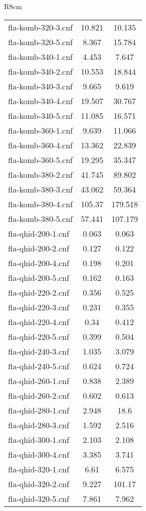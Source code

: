 \begin{wraptable}[30]{R}{8cm}
\begin{tabular}{l| c c }
fla-komb-320-3.cnf & 10.821 & 10.135 \\
fla-komb-320-5.cnf & 8.367 & 15.784 \\
fla-komb-340-1.cnf & 4.453 & 7.647 \\
fla-komb-340-2.cnf & 10.553 & 18.844 \\
fla-komb-340-3.cnf & 9.665 & 9.619 \\
fla-komb-340-4.cnf & 19.507 & 30.767 \\
fla-komb-340-5.cnf & 11.085 & 16.571 \\
fla-komb-360-1.cnf & 9.639 & 11.066 \\
fla-komb-360-4.cnf & 13.362 & 22.839 \\
fla-komb-360-5.cnf & 19.295 & 35.347 \\
fla-komb-380-2.cnf & 41.745 & 89.802 \\
fla-komb-380-3.cnf & 43.062 & 59.364 \\
fla-komb-380-4.cnf & 105.37 & 179.518 \\
fla-komb-380-5.cnf & 57.441 & 107.179 \\
fla-qhid-200-1.cnf & 0.063 & 0.063 \\
fla-qhid-200-2.cnf & 0.127 & 0.122 \\
fla-qhid-200-4.cnf & 0.198 & 0.201 \\
fla-qhid-200-5.cnf & 0.162 & 0.163 \\
fla-qhid-220-2.cnf & 0.356 & 0.525 \\
fla-qhid-220-3.cnf & 0.231 & 0.355 \\
fla-qhid-220-4.cnf & 0.34 & 0.412 \\
fla-qhid-220-5.cnf & 0.399 & 0.504 \\
fla-qhid-240-3.cnf & 1.035 & 3.079 \\
fla-qhid-240-5.cnf & 0.624 & 0.724 \\
fla-qhid-260-1.cnf & 0.838 & 2.389 \\
fla-qhid-260-2.cnf & 0.602 & 0.613 \\
fla-qhid-280-1.cnf & 2.948 & 18.6 \\
fla-qhid-280-3.cnf & 1.592 & 2.516 \\
fla-qhid-300-1.cnf & 2.103 & 2.108 \\
fla-qhid-300-4.cnf & 3.385 & 3.741 \\
\fi
fla-qhid-320-1.cnf & 6.61 & 6.575 \\
fla-qhid-320-2.cnf & 9.227 & 101.17 \\
fla-qhid-320-5.cnf & 7.861 & 7.962 \\

\end{tabular}
\end{wraptable}
